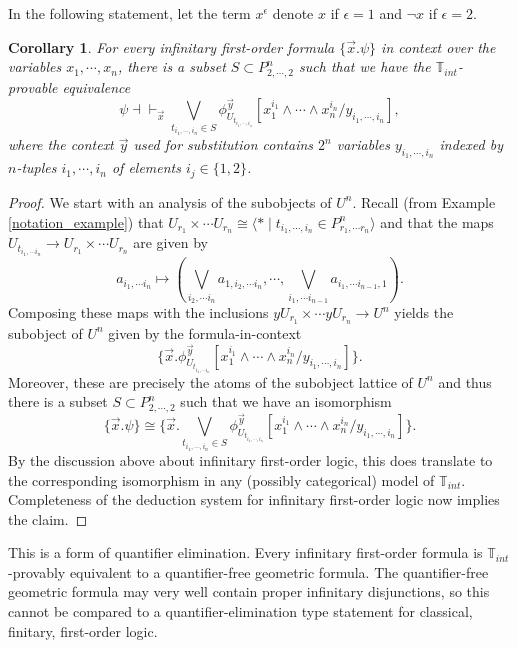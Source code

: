 \documentclass[a4paper]{amsproc}
\theoremstyle{plain}
\newtheorem{corollary}[theorem]{Corollary}
\theoremstyle{definition}
\theoremstyle{remark}
\numberwithin{equation}{section}
\newcommand{\y}{\textit{y}}
\begin{document}
In the following statement, let the term $x^{\epsilon}$ denote $x$ if $\epsilon = 1$ and $\neg x$ if $\epsilon = 2$.

\begin{corollary}
    For every infinitary first-order formula $\{\vec{x}. \psi\}$ in context over the variables $x_1,\cdots, x_n$, there is a subset $S \subset P^n_{2,\cdots,2}$ such that we have the $\mathbb{T}_{int}$-provable equivalence
    \[
        \psi \dashv \vdash_{\vec{x}} \bigvee_{t_{i_1,\cdots,i_n} \in S} \phi^{\vec{y}}_{U_{t_{i_1,\cdots,i_n}}} [ x_1^{i_1} \wedge \cdots \wedge x_n^{i_n} / y_{i_1,\cdots, i_n}] ,
    \]
    where the context $\vec{y}$ used for substitution contains $2^n$ variables $y_{i_1,\cdots,i_n}$ indexed by $n$-tuples $i_1,\cdots,i_n$ of elements $i_j \in \{1,2\}$. 
\end{corollary}

\begin{proof}
    We start with an analysis of the subobjects of $U^n$. Recall (from Example \ref{notation_example}) that $U_{r_1} \times \cdots U_{r_n} \cong \langle * \mid t_{i_1,\cdots, i_n} \in P^n_{r_1,\cdots r_n} \rangle$ and that the maps $U_{t_{i_1,\cdots i_n}} \to U_{r_1} \times \cdots U_{r_n}$ are given by
    \[
        a_{i_1,\cdots i_n} \mapsto (\bigvee_{i_2,\cdots i_n} a_{1,i_2,\cdots i_n},\cdots, \bigvee_{i_1,\cdots i_{n - 1}} a_{i_1,\cdots i_{n - 1}, 1}) .
    \]
    Composing these maps with the inclusions $\y U_{r_1} \times \cdots \y U_{r_n} \to U^n$ yields the subobject of $U^n$ given by the formula-in-context
    \[
        \{ \vec{x} . \phi^{\vec{y}}_{U_{t_{i_1,\cdots i_n}}} [ x_1^{i_1} \wedge \cdots \wedge x_n^{i_n} / y_{i_1,\cdots, i_n}] \} .
    \]
    Moreover, these are precisely the atoms of the subobject lattice of $U^n$ and thus there is a subset $S \subset P^n_{2,\cdots,2}$ such that we have an isomorphism
    \[
        \{ \vec{x} . \psi \} \cong \{ \vec{x} . \bigvee_{t_{i_1,\cdots,i_n} \in S} \phi^{\vec{y}}_{U_{t_{i_1,\cdots,i_n}}} [ x_1^{i_1} \wedge \cdots \wedge x_n^{i_n} / y_{i_1,\cdots, i_n}] \} .
    \]
    By the discussion above about infinitary first-order logic, this does translate to the corresponding isomorphism in any (possibly categorical) model of $\mathbb{T}_{int}$. Completeness of the deduction system for infinitary first-order logic now implies the claim.
\end{proof}

This is a form of quantifier elimination. Every infinitary first-order formula is $\mathbb{T}_{int}$-provably equivalent to a quantifier-free geometric formula. The quantifier-free geometric formula may very well contain proper infinitary disjunctions, so this cannot be compared to a quantifier-elimination type statement for classical, finitary, first-order logic.
\end{document}
